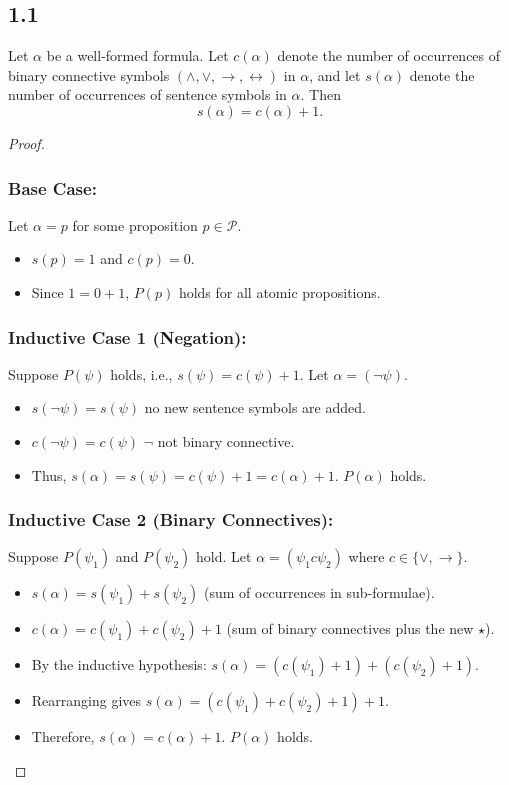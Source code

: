 \documentclass{article}
\newtheorem{theorem}{Theorem}[section]
\let\oldtheorem\theorem
\let\endoldtheorem\endtheorem
\renewenvironment{theorem}
  {\begin{tcolorbox}[
      colback=yellow!6,
      colframe=yellow!60!black,
      boxrule=0.6pt,
      arc=2pt,
      left=6pt,right=6pt,top=4pt,bottom=4pt,
      parbox=false
    ]\oldtheorem}
  {\endoldtheorem\end{tcolorbox}}
\begin{document}
\subsection*{1.1}
\begin{theorem}
    Let $\alpha$ be a well-formed formula. Let $c(\alpha)$ denote the number of occurrences of
    binary connective symbols $(\wedge,\vee,\to,\leftrightarrow)$ in $\alpha$, and let
    $s(\alpha)$ denote the number of occurrences of sentence symbols in $\alpha$.
    Then
    \[
    s(\alpha) = c(\alpha) + 1 .
    \]
\end{theorem}
\begin{proof}
\subsubsection*{Base Case:} Let $\alpha = p$ for some proposition $p \in \mathcal{P}$.
\begin{itemize}
    \item $s(p) = 1$ and $c(p) = 0$.
    \item Since $1 = 0 + 1$, $P(p)$ holds for all atomic propositions.
\end{itemize}

\subsubsection*{Inductive Case 1 (Negation):} Suppose $P(\psi)$ holds, i.e., $s(\psi) = c(\psi) + 1$. Let $\alpha = (\neg \psi)$.
\begin{itemize}
    \item $s(\neg \psi) = s(\psi)$ no new sentence symbols are added.
    \item $c(\neg \psi) = c(\psi)$ $\neg$ not binary connective.
    \item Thus, $s(\alpha) = s(\psi) = c(\psi) + 1 = c(\alpha) + 1$. $P(\alpha)$ holds.
\end{itemize}

\subsubsection*{Inductive Case 2 (Binary Connectives):} Suppose $P(\psi_1)$ and $P(\psi_2)$ hold. Let $\alpha = (\psi_1 c \psi_2)$ where $c \in \{\lor, \to\}$.
\begin{itemize}
    \item $s(\alpha) = s(\psi_1) + s(\psi_2)$ (sum of occurrences in sub-formulae).
    \item $c(\alpha) = c(\psi_1) + c(\psi_2) + 1$ (sum of binary connectives plus the new $\star$).
    \item By the inductive hypothesis: $s(\alpha) = (c(\psi_1) + 1) + (c(\psi_2) + 1)$.
    \item Rearranging gives $s(\alpha) = (c(\psi_1) + c(\psi_2) + 1) + 1$.
    \item Therefore, $s(\alpha) = c(\alpha) + 1$. $P(\alpha)$ holds.
\end{itemize}

\end{proof}
\end{document}
